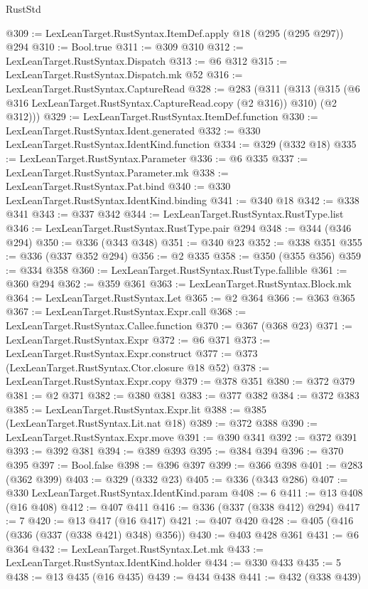 \begin{lexlean}{RustStd}
\begin{coremodule}
{\begin{coremodule}
{{{{{{{{{{@309 := LexLeanTarget.RustSyntax.ItemDef.apply @18 (@295 (@295 @297)) @294
@310 := Bool.true
@311 := @309 @310
@312 := LexLeanTarget.RustSyntax.Dispatch
@313 := @6 @312
@315 := LexLeanTarget.RustSyntax.Dispatch.mk @52
@316 := LexLeanTarget.RustSyntax.CaptureRead
@328 := @283
    (@311
      (@313 (@315 (@6 @316 LexLeanTarget.RustSyntax.CaptureRead.copy (@2 @316)) @310) (@2 @312)))
@329 := LexLeanTarget.RustSyntax.ItemDef.function
@330 := LexLeanTarget.RustSyntax.Ident.generated
@332 := @330 LexLeanTarget.RustSyntax.IdentKind.function
@334 := @329 (@332 @18)
@335 := LexLeanTarget.RustSyntax.Parameter
@336 := @6 @335
@337 := LexLeanTarget.RustSyntax.Parameter.mk
@338 := LexLeanTarget.RustSyntax.Pat.bind
@340 := @330 LexLeanTarget.RustSyntax.IdentKind.binding
@341 := @340 @18
@342 := @338 @341
@343 := @337 @342
@344 := LexLeanTarget.RustSyntax.RustType.list
@346 := LexLeanTarget.RustSyntax.RustType.pair @294
@348 := @344 (@346 @294)
@350 := @336 (@343 @348)
@351 := @340 @23
@352 := @338 @351
@355 := @336 (@337 @352 @294)
@356 := @2 @335
@358 := @350 (@355 @356)
@359 := @334 @358
@360 := LexLeanTarget.RustSyntax.RustType.fallible
@361 := @360 @294
@362 := @359 @361
@363 := LexLeanTarget.RustSyntax.Block.mk
@364 := LexLeanTarget.RustSyntax.Let
@365 := @2 @364
@366 := @363 @365
@367 := LexLeanTarget.RustSyntax.Expr.call
@368 := LexLeanTarget.RustSyntax.Callee.function
@370 := @367 (@368 @23)
@371 := LexLeanTarget.RustSyntax.Expr
@372 := @6 @371
@373 := LexLeanTarget.RustSyntax.Expr.construct
@377 := @373 (LexLeanTarget.RustSyntax.Ctor.closure @18 @52)
@378 := LexLeanTarget.RustSyntax.Expr.copy
@379 := @378 @351
@380 := @372 @379
@381 := @2 @371
@382 := @380 @381
@383 := @377 @382
@384 := @372 @383
@385 := LexLeanTarget.RustSyntax.Expr.lit
@388 := @385 (LexLeanTarget.RustSyntax.Lit.nat @18)
@389 := @372 @388
@390 := LexLeanTarget.RustSyntax.Expr.move
@391 := @390 @341
@392 := @372 @391
@393 := @392 @381
@394 := @389 @393
@395 := @384 @394
@396 := @370 @395
@397 := Bool.false
@398 := @396 @397
@399 := @366 @398
@401 := @283 (@362 @399)
@403 := @329 (@332 @23)
@405 := @336 (@343 @286)
@407 := @330 LexLeanTarget.RustSyntax.IdentKind.param
@408 := 6
@411 := @13 @408 (@16 @408)
@412 := @407 @411
@416 := @336 (@337 (@338 @412) @294)
@417 := 7
@420 := @13 @417 (@16 @417)
@421 := @407 @420
@428 := @405 (@416 (@336 (@337 (@338 @421) @348) @356))
@430 := @403 @428 @361
@431 := @6 @364
@432 := LexLeanTarget.RustSyntax.Let.mk
@433 := LexLeanTarget.RustSyntax.IdentKind.holder
@434 := @330 @433
@435 := 5
@438 := @13 @435 (@16 @435)
@439 := @434 @438
@441 := @432 (@338 @439)
}}}}}}}}}}
\end{coremodule}}
\end{coremodule}
\end{lexlean}
